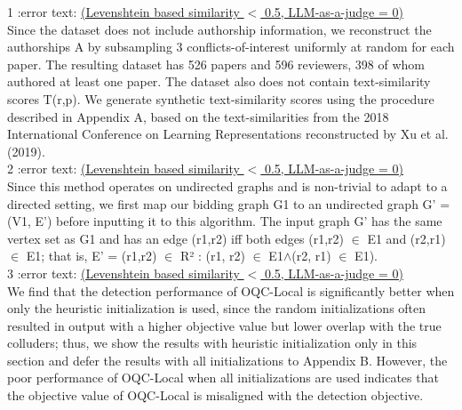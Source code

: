 \documentclass{article}
\newcommand{\gemini}{\texttt{Gemini 2.5 Pro}}
\begin{document}
\begin{appendix}
\begin{tcolorbox} [breakable,colback=black!5!white,colframe=black!20!white,title=\textbf{\textcolor{black}{Failed Identification using \gemini}}]
1 :error text: \underline{(Levenshtein based similarity $<$ 0.5, LLM-as-a-judge = 0)}\\ 
Since the dataset does not include authorship information, we reconstruct the authorships A by subsampling 3 conflicts-of-interest uniformly at random for each paper. The resulting dataset has 526 papers and 596 reviewers, 398 of whom authored at least one paper. The dataset also does not contain text-similarity scores T(r,p). We generate synthetic text-similarity scores using the procedure described in Appendix A, based on the text-similarities from the 2018 International Conference on Learning Representations reconstructed by Xu et al. (2019).\\

2 :error text: \underline{(Levenshtein based similarity $<$ 0.5, LLM-as-a-judge = 0)}\\
Since this method operates on undirected graphs and is non-trivial to adapt to a directed setting, we first map our bidding graph G1 to an undirected graph G' = (V1, E') before inputting it to this algorithm. The input graph G' has the same vertex set as G1 and has an edge (r1,r2) iff both edges (r1,r2) $\in$ E1 and (r2,r1) $\in$ E1; that is, E' = {(r1,r2) $\in$ R² : (r1, r2) $\in$ E1$\land$(r2, r1) $\in$ E1}).\\

3 :error text: \underline{(Levenshtein based similarity $<$ 0.5, LLM-as-a-judge = 0)}\\
We find that the detection performance of OQC-Local is significantly better when only the heuristic initialization is used, since the random initializations often resulted in output with a higher objective value but lower overlap with the true colluders; thus, we show the results with heuristic initialization only in this section and defer the results with all initializations to Appendix B. However, the poor performance of OQC-Local when all initializations are used indicates that the objective value of OQC-Local is misaligned with the detection objective.\\


\end{tcolorbox}
\end{appendix}
\end{document}

